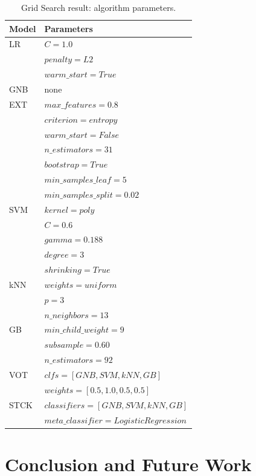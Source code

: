 \begin{table}[h]
\centering
\caption{Grid Search result: algorithm parameters.}
\label{tab:params}
\begin{tabular}{| l | l |}
\hline
Model & Parameters \\ \hline 
LR        & $C=1.0$ \\ 
          & $penalty=L2$ \\
          & $warm\_start=True$ \\ \hline
GNB       & none \\ \hline
EXT       & $max\_features=0.8$ \\ 
          & $criterion=entropy$ \\
          & $warm\_start=False$ \\
          & $n\_estimators=31$ \\
          & $bootstrap=True$ \\
          & $min\_samples\_leaf=5$ \\ 
          & $min\_samples\_split=0.02$ \\ \hline
SVM       & $kernel=poly$ \\
          & $C=0.6$ \\
          & $gamma=0.188$ \\ 
          & $degree=3$ \\
          & $shrinking=True$ \\ \hline
kNN       & $weights=uniform$ \\
          & $p=3$ \\
          & $n\_neighbors=13$ \\ \hline
GB        & $min\_child\_weight=9 $ \\
          & $subsample=0.60$ \\ 
          & $n\_estimators=92$ \\ \hline
VOT       & $clfs=[GNB, SVM, kNN, GB]$ \\
          & $weights=[0.5, 1.0, 0.5, 0.5]$ \\ \hline
STCK      & $classifiers=[GNB, SVM, kNN, GB]$ \\
          & $meta\_classifier=LogisticRegression$ \\          
\hline
\end{tabular}
\end{table}


\section{Conclusion and Future Work}\label{sec:con}

